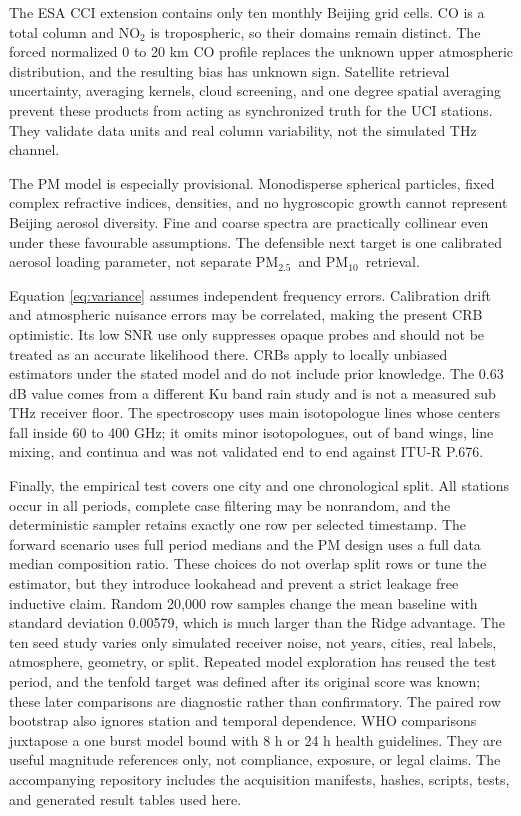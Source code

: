 \documentclass[conference]{IEEEtran}
\newcommand{\pmfive}{PM$_{2.5}$}
\newcommand{\pmten}{PM$_{10}$}
\begin{document}
The ESA CCI extension contains only ten monthly Beijing grid cells. CO is a total column and NO$_2$ is tropospheric, so their domains remain distinct. The forced normalized 0 to 20 km CO profile replaces the unknown upper atmospheric distribution, and the resulting bias has unknown sign. Satellite retrieval uncertainty, averaging kernels, cloud screening, and one degree spatial averaging prevent these products from acting as synchronized truth for the UCI stations. They validate data units and real column variability, not the simulated THz channel.

The PM model is especially provisional. Monodisperse spherical particles, fixed complex refractive indices, densities, and no hygroscopic growth cannot represent Beijing aerosol diversity. Fine and coarse spectra are practically collinear even under these favourable assumptions. The defensible next target is one calibrated aerosol loading parameter, not separate \pmfive\ and \pmten\ retrieval.

Equation \eqref{eq:variance} assumes independent frequency errors. Calibration drift and atmospheric nuisance errors may be correlated, making the present CRB optimistic. Its low SNR use only suppresses opaque probes and should not be treated as an accurate likelihood there. CRBs apply to locally unbiased estimators under the stated model and do not include prior knowledge. The 0.63 dB value comes from a different Ku band rain study and is not a measured sub THz receiver floor. The spectroscopy uses main isotopologue lines whose centers fall inside 60 to 400 GHz; it omits minor isotopologues, out of band wings, line mixing, and continua and was not validated end to end against ITU-R P.676.

Finally, the empirical test covers one city and one chronological split. All stations occur in all periods, complete case filtering may be nonrandom, and the deterministic sampler retains exactly one row per selected timestamp. The forward scenario uses full period medians and the PM design uses a full data median composition ratio. These choices do not overlap split rows or tune the estimator, but they introduce lookahead and prevent a strict leakage free inductive claim. Random 20,000 row samples change the mean baseline with standard deviation 0.00579, which is much larger than the Ridge advantage. The ten seed study varies only simulated receiver noise, not years, cities, real labels, atmosphere, geometry, or split. Repeated model exploration has reused the test period, and the tenfold target was defined after its original score was known; these later comparisons are diagnostic rather than confirmatory. The paired row bootstrap also ignores station and temporal dependence. WHO comparisons juxtapose a one burst model bound with 8 h or 24 h health guidelines. They are useful magnitude references only, not compliance, exposure, or legal claims. The accompanying repository includes the acquisition manifests, hashes, scripts, tests, and generated result tables used here.
\end{document}
